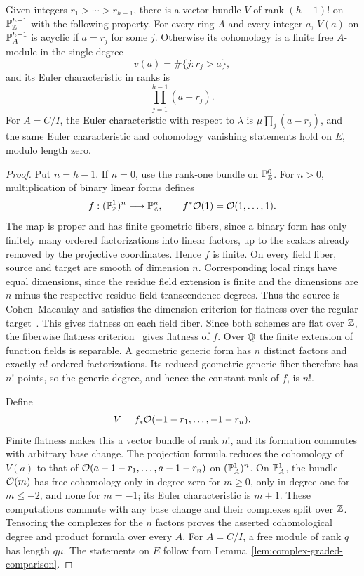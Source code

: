 \begin{lemma}\label{lem:complex-root-bundle}
Given integers $r_1>\cdots>r_{h-1}$, there is a vector bundle $V$ of rank
$(h-1)!$ on $\mathbb P_\mathbb Z^{h-1}$ with the following property. For every ring
$A$ and every integer $a$, $V(a)$ on $\mathbb P_A^{h-1}$ is acyclic if $a=r_j$
for some $j$. Otherwise its cohomology is a finite free $A$-module in
the single degree
\[
 v(a)=\#\{j:r_j>a\},
\]
and its Euler characteristic in ranks is
\[
 \prod_{j=1}^{h-1}(a-r_j).
\]
For $A=C/I$, the Euler characteristic with respect to $\lambda$ is
$\mu\prod_j(a-r_j)$, and the same Euler characteristic and cohomology
vanishing statements hold on $E$, modulo length zero.
\end{lemma}
\begin{proof}
Put $n=h-1$. If $n=0$, use the rank-one bundle on $\mathbb P_\mathbb Z^0$.
For $n>0$, multiplication of binary linear forms defines
\[
 f:(\mathbb P_\mathbb Z^1)^n\longrightarrow\mathbb P_\mathbb Z^n,
 \qquad f^*\mathcal O(1)=\mathcal O(1,\ldots,1).
\]
The map is proper and has finite geometric fibers, since a binary form
has only finitely many ordered factorizations into linear factors, up to
the scalars already removed by the projective coordinates. Hence $f$ is
finite. On every field fiber, source and target are smooth of dimension
$n$. Corresponding local rings have equal dimensions, since the residue
field extension is finite and the dimensions are $n$ minus the respective
residue-field transcendence degrees. Thus the source is Cohen--Macaulay
and satisfies the dimension criterion for flatness over the regular
target~\cite[Tag~00R4]{Stacks}. This gives flatness on each field fiber.
Since both schemes are
flat over $\mathbb Z$, the
fiberwise flatness criterion~\cite[Tag~039D]{Stacks} gives flatness
of $f$. Over $\mathbb Q$ the finite
extension of function fields is separable. A geometric generic form has
$n$ distinct factors and exactly $n!$ ordered factorizations. Its reduced
geometric generic fiber therefore has $n!$ points, so the generic degree,
and hence the constant rank of $f$, is $n!$.

Define
\[
 V=f_*\mathcal O(-1-r_1,\ldots,-1-r_n).
\]
Finite flatness makes this a vector bundle of rank $n!$, and its formation
commutes with arbitrary base change. The projection formula reduces the
cohomology of $V(a)$ to that of
$\mathcal O(a-1-r_1,\ldots,a-1-r_n)$ on $(\mathbb P_A^1)^n$.
On $\mathbb P_A^1$, the bundle $\mathcal O(m)$ has free cohomology only in degree zero
for $m\geq0$, only in degree one for $m\leq-2$, and none for $m=-1$;
its Euler characteristic is $m+1$. These computations commute with any
base change and their complexes split over $\mathbb Z$. Tensoring the complexes
for the $n$ factors proves the asserted cohomological degree and product
formula over every $A$. For $A=C/I$, a free module of rank $q$ has length
$q\mu$. The statements on $E$ follow from
Lemma~\ref{lem:complex-graded-comparison}.
\end{proof}


